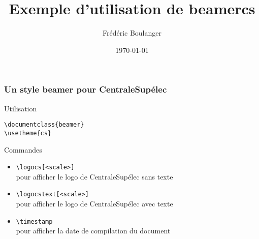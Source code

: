 \documentclass{beamer}
\title{Exemple d'utilisation de \textbf{beamercs}}
\author{Frédéric Boulanger}
\date{\today}
\institute[Supélec]{CentraleSupélec -- Département Informatique}
\begin{document}
\titlegraphic{\logocstext}

\frame{\titlepage}

\begin{frame}[fragile]
  \frametitle{Un style beamer pour CentraleSupélec}
  
  \begin{block}{Utilisation}
    \begin{verbatim}
\documentclass{beamer}
\usetheme{cs}
    \end{verbatim}
  \end{block}
  
  \begin{block}{Commandes}
	\begin{itemize}
	  \item \verb|\logocs[<scale>]| \\
	        pour afficher le logo de CentraleSupélec sans texte\\
			\centerline{\logocs}
	
	  \item \verb|\logocstext[<scale>]| \\
	        pour afficher le logo de CentraleSupélec avec texte\\
			\centerline{\logocstext}

      \item \verb|\timestamp| \\
            pour afficher la date de compilation du document \\
            \centerline{\timestamp}
	\end{itemize}
  \end{block}
  
\end{frame}
\end{document}
